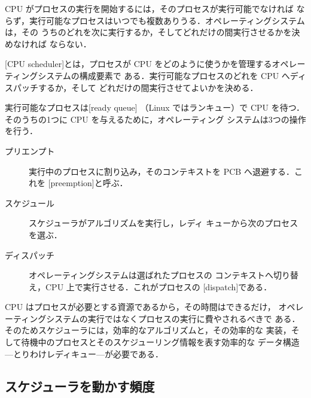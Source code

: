 \documentclass[../main.tex]{subfiles}
\begin{document}
CPU がプロセスの実行を開始するには，そのプロセスが実行可能でなければ
ならず，実行可能なプロセスはいつでも複数ありうる．オペレーティングシステムは，その
うちのどれを次に実行するか，そしてどれだけの間実行させるかを決めなければ
ならない．

\begin{definition}
  [CPU scheduler]とは，プロセスが
  CPU をどのように使うかを管理するオペレーティングシステムの構成要素で
  ある．実行可能なプロセスのどれを CPU へディスパッチするか，そして
  どれだけの間実行させてよいかを決める．
\end{definition}

実行可能なプロセスは[ready queue]
（Linux ではランキュー）で CPU を待つ．そのうちの1つに CPU を与えるために，オペレーティング
システムは3つの操作を行う．
\begin{description}
  \item[プリエンプト] 実行中のプロセスに割り込み，そのコンテキストを
    PCB へ退避する．これを
    [preemption]と呼ぶ．
  \item[スケジュール] スケジューラがアルゴリズムを実行し，レディ
    キューから次のプロセスを選ぶ．
  \item[ディスパッチ] オペレーティングシステムは選ばれたプロセスの
    コンテキストへ切り替え，CPU 上で実行させる．これがプロセスの
    [dispatch]である．
\end{description}

CPU はプロセスが必要とする資源であるから，その時間はできるだけ，
オペレーティングシステムの実行ではなくプロセスの実行に費やされるべきで
ある．そのためスケジューラには，効率的なアルゴリズムと，その効率的な
実装，そして待機中のプロセスとそのスケジューリング情報を表す効率的な
データ構造---とりわけレディキュー---が必要である．


\subsection{スケジューラを動かす頻度}
\end{document}
